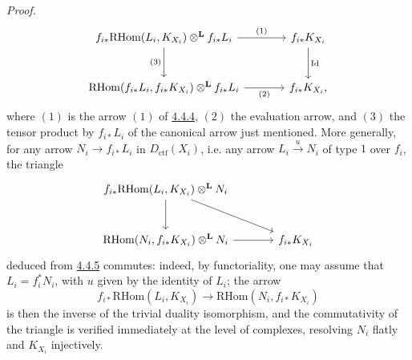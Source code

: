 \documentclass[11pt]{article}
\newenvironment{prooftext}[1][Proof]{\par\noindent\emph{#1.}\ }{\par\medskip}
\providecommand{\RHom}{\mathrm{RHom}}
\providecommand{\Dctf}{D_{\mathrm{ctf}}}
\providecommand{\Id}{\mathrm{Id}}
\providecommand{\Dctf}{D_{\mathrm{ctf}}}
\providecommand{\RHom}{\mathrm{RHom}}
\providecommand{\RHom}{\mathrm R\mathcal{H}om}
\providecommand{\RHom}{\mathrm{RHom}}
\begin{document}
\begin{prooftext}[Proof]
\begin{equation}
\begin{tikzcd}[column sep=large,row sep=large]
f_{i*}\RHom(L_i,K_{X_i})\otimes^{\mathbf L} f_{i*}L_i
 \arrow[r,"(1)"] \arrow[d,"(3)"'] &
f_{i*}K_{X_i} \arrow[d,"\Id"]\\
\RHom(f_{i*}L_i,f_{i*}K_{X_i})\otimes^{\mathbf L} f_{i*}L_i
 \arrow[r,"(2)"'] &
f_{i*}K_{X_i},
\end{tikzcd}
\end{equation}
where $(1)$ is the arrow $(1)$ of \hyperref[sga5:III:equation:4.4.4]{4.4.4}, $(2)$ the evaluation arrow, and $(3)$ the tensor product by $f_{i*}L_i$ of the canonical arrow just mentioned. More generally, for any arrow $N_i\longrightarrow f_{i*}L_i$ in $\Dctf(X_i)$, i.e. any arrow $L_i\xrightarrow{u}N_i$ of type $1$ over $f_i$, the triangle
\[
\begin{tikzcd}[column sep=large,row sep=large]
f_{i*}\RHom(L_i,K_{X_i})\otimes^{\mathbf L}N_i
 \arrow[dr] \arrow[d] & \\
\RHom(N_i,f_{i*}K_{X_i})\otimes^{\mathbf L}N_i \arrow[r] &
f_{i*}K_{X_i}
\end{tikzcd}
\]
deduced from \hyperref[sga5:III:equation:4.4.5]{4.4.5} commutes: indeed, by functoriality, one may assume that $L_i=f_i^*N_i$, with $u$ given by the identity of $L_i$; the arrow
\[
f_{i*}\RHom(L_i,K_{X_i})\longrightarrow\RHom(N_i,f_{i*}K_{X_i})
\]
is then the inverse of the trivial duality isomorphism, and the commutativity of the triangle is verified immediately at the level of complexes, resolving $N_i$ flatly and $K_{X_i}$ injectively.


\end{prooftext}
\end{document}
